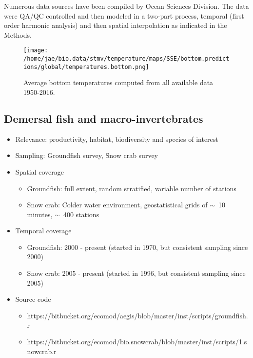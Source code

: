 \documentclass[letterpaper,portrait,11pt]{scrartcl}
\numberwithin{equation}{section}    %
\numberwithin{figure}{section}    %
\numberwithin{table}{section}       %
\begin{document}
Numerous data sources have been compiled by Ocean Sciences Division. The data were QA/QC controlled and then modeled in a two-part process, temporal (first order harmonic analysis) and then spatial interpolation as indicated in the Methods. 


\begin{figure}[h]
  \centering
  \texttt{[image: /home/jae/bio.data/stmv/temperature/maps/SSE/bottom.predictions/global/temperatures.bottom.png]}
  \caption{Average bottom temperatures computed from all available data 1950-2016.}
  \label{fig:TemperatureBottomMap}
\end{figure}



\subsection{Demersal fish and macro-invertebrates}
\begin{itemize}
  \item Relevance:  productivity, habitat, biodiversity and species of interest
  \item Sampling:  Groundfish survey, Snow crab survey 
  \item Spatial coverage
    \begin{itemize}
      \item Groundfish: full extent, random stratified, variable number of stations
      \item Snow crab: Colder water environment, geostatistical grids of $\sim$~10 minutes, $\sim$~400 stations 
    \end{itemize}
  \item Temporal coverage
    \begin{itemize}
      \item Groundfish: 2000 - present (started in 1970, but consistent sampling since 2000)
      \item Snow crab: 2005 - present (started in 1996, but consistent sampling since 2005)
    \end{itemize}

  \item Source code
      \begin{itemize}
        \item https://bitbucket.org/ecomod/aegis/blob/master/inst/scripts/groundfish.r
        \item https://bitbucket.org/ecomod/bio.snowcrab/blob/master/inst/scripts/1.snowcrab.r
      \end{itemize}
  
\end{itemize}
\end{document}
